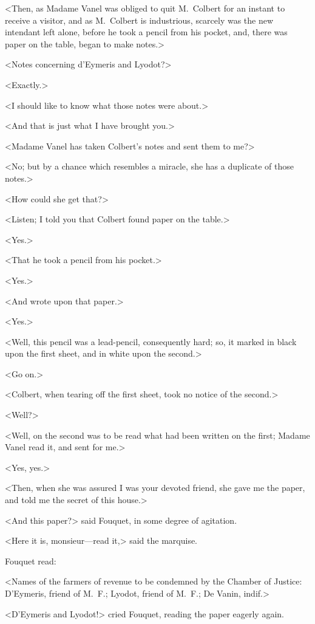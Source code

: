 <Then, as Madame Vanel was obliged to quit M.~Colbert for an instant to receive a visitor, and as M.~Colbert is industrious, scarcely was the new intendant left alone, before he took a pencil from his pocket, and, there was paper on the table, began to make notes.>

<Notes concerning d'Eymeris and Lyodot?>

<Exactly.>

<I should like to know what those notes were about.>

<And that is just what I have brought you.>

<Madame Vanel has taken Colbert's notes and sent them to me?>

<No; but by a chance which resembles a miracle, she has a duplicate of those notes.>

<How could she get that?>

<Listen; I told you that Colbert found paper on the table.>

<Yes.>

<That he took a pencil from his pocket.>

<Yes.>

<And wrote upon that paper.>

<Yes.>

<Well, this pencil was a lead-pencil, consequently hard; so, it marked in black upon the first sheet, and in white upon the second.>

<Go on.>

<Colbert, when tearing off the first sheet, took no notice of the second.>

<Well?>

<Well, on the second was to be read what had been written on the first; Madame Vanel read it, and sent for me.>

<Yes, yes.>

<Then, when she was assured I was your devoted friend, she gave me the paper, and told me the secret of this house.>

<And this paper?> said Fouquet, in some degree of agitation.

<Here it is, monsieur—read it,> said the marquise.

Fouquet read:

<Names of the farmers of revenue to be condemned by the Chamber of Justice: D'Eymeris, friend of M.~F.; Lyodot, friend of M.~F.; De Vanin, indif.>

<D'Eymeris and Lyodot!> cried Fouquet, reading the paper eagerly again.

